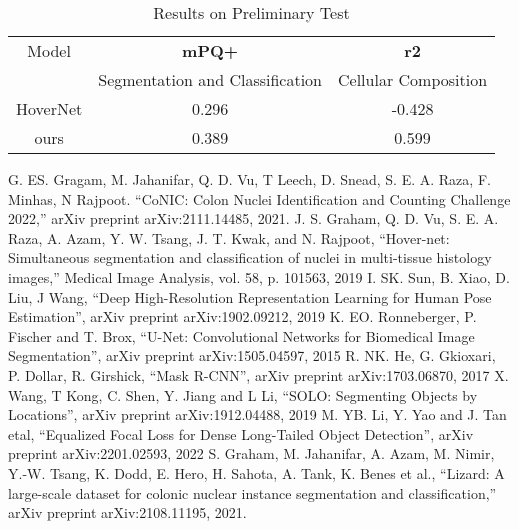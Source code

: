 \documentclass[conference]{IEEEtran}
\begin{document}
\begin{table}[htbp]
\caption{Results on Preliminary Test}
\begin{center}
\begin{tabular}{|c|c|c|}
\hline
 Model & \textbf{mPQ+} & \textbf{r2} \\
  & Segmentation and Classification& Cellular Composition \\
\hline
 HoverNet & 0.296 & -0.428 \\
\hline
 ours & 0.389 & 0.599 \\
\hline
\end{tabular}
\label{tab1}
\end{center}
\end{table}

\begin{thebibliography}{00}
 G. ES. Gragam, M. Jahanifar, Q. D. Vu, T Leech, D. Snead, S. E. A. Raza, F. Minhas, N Rajpoot. “CoNIC: Colon Nuclei Identification and Counting Challenge 2022,” arXiv preprint arXiv:2111.14485, 2021.
 J. S. Graham, Q. D. Vu, S. E. A. Raza, A. Azam, Y. W. Tsang, J. T. Kwak, and N. Rajpoot, “Hover-net: Simultaneous segmentation and classification of nuclei in multi-tissue histology images,” Medical Image Analysis, vol. 58, p. 101563, 2019
 I. SK. Sun, B. Xiao, D. Liu, J Wang, “Deep High-Resolution Representation Learning for Human Pose Estimation”, arXiv preprint arXiv:1902.09212, 2019
 K. EO. Ronneberger, P. Fischer and T. Brox, “U-Net: Convolutional Networks for Biomedical Image Segmentation”, arXiv preprint arXiv:1505.04597, 2015
 R. NK. He, G. Gkioxari, P. Dollar, R. Girshick, “Mask R-CNN”, arXiv preprint arXiv:1703.06870, 2017
 X. Wang, T Kong, C. Shen, Y. Jiang and L Li, “SOLO: Segmenting Objects by Locations”, arXiv preprint arXiv:1912.04488, 2019
 M. YB. Li, Y. Yao and J. Tan etal, “Equalized Focal Loss for Dense Long-Tailed Object Detection”, arXiv preprint arXiv:2201.02593, 2022
 S. Graham, M. Jahanifar, A. Azam, M. Nimir, Y.-W. Tsang, K. Dodd, E. Hero, H. Sahota, A. Tank, K. Benes et al., “Lizard: A large-scale dataset for colonic nuclear instance segmentation and classification,” arXiv preprint arXiv:2108.11195, 2021.

\end{thebibliography}
\end{document}
